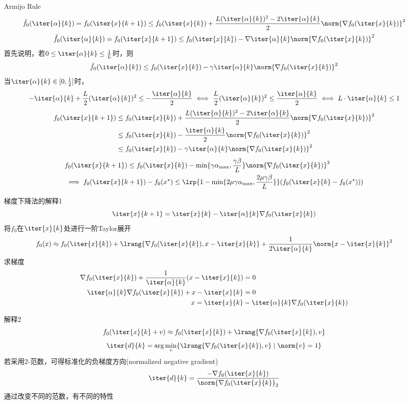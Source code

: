 Armijo Rule
\[\tilde{f}_0(\iter{\alpha}{k})=f_0(\iter{x}{k+1})\leq f_0(\iter{x}{k})+\frac{L(\iter{\alpha}{k})^2-2\iter{\alpha}{k}}{2}\norm{\nabla f_0(\iter{x}{k})}^2\]
\[\tilde{f}_0(\iter{\alpha}{k})=f_0(\iter{x}{k+1})\leq f_0(\iter{x}{k})-\nabla\iter{\alpha}{k}\norm{\nabla f_0(\iter{x}{k})}^2\]
首先说明，若$0\leq\iter{\alpha}{k}\leq\frac{1}{L}$时，则
\[\tilde{f}_0(\iter{\alpha}{k})\leq f_0(\iter{x}{k})-\gamma\iter{\alpha}{k}\norm{\nabla f_0(\iter{x}{k})}^2\]
当$\iter{\alpha}{k}\in[0,\frac{1}{2}]$时，
\[-\iter{\alpha}{k}+\frac{L}{2}(\iter{\alpha}{k})^2\leq -\frac{\iter{\alpha}{k}}{2}\iff \frac{L}{2}(\iter{\alpha}{k})^2\leq\frac{\iter{\alpha}{k}}{2}\iff L\cdot\iter{\alpha}{k}\leq 1\]
\[\begin{aligned}
    f_0(\iter{x}{k+1})&\leq f_0(\iter{x}{k})+\frac{L(\iter{\alpha}{k})^2-2\iter{\alpha}{k}}{2}\norm{\nabla f_0(\iter{x}{k})}^2\\
    &\leq f_0(\iter{x}{k})-\frac{\iter{\alpha}{k}}{2}\norm{\nabla f_0(\iter{x}{k})}^2\\
    &\leq f_0(\iter{x}{k})-\gamma\iter{\alpha}{k}\norm{\nabla f_0(\iter{x}{k})}^2
\end{aligned}\]
\[\begin{aligned}
    &f_0(\iter{x}{k+1})\leq f_0(\iter{x}{k})-\min\{\gamma\alpha_{\max},\frac{\gamma\beta}{L}\}\norm{\nabla f_0(\iter{x}{k})}^2\\
    &\implies f_0(\iter{x}{k+1})-f_0(x^\star)\leq\lrp{1-\min\{2\mu\gamma\alpha_{\max},\frac{2\mu\gamma\beta}{L}\}}(f_0(\iter{x}{k}-f_0(x^\star)))
\end{aligned}\]

梯度下降法的解释1
\[\iter{x}{k+1}=\iter{x}{k}-\iter{\alpha}{k}\nabla f_0(\iter{x}{k})\]
将$f_0$在$\iter{x}{k}$处进行一阶Taylor展开
\[f_0(x)\approx f_0(\iter{x}{k})+\lrang{\nabla f_0(\iter{x}{k}),x-\iter{x}{k}}+\frac{1}{2\iter{\alpha}{k}}\norm{x-\iter{x}{k}}^2\]
求梯度
\[\begin{aligned}
    \nabla f_0(\iter{x}{k})+\frac{1}{\iter{\alpha}{k}}(x-\iter{x}{k})&=0\\
    \iter{\alpha}{k}\nabla f_0(\iter{x}{k})+x-\iter{x}{k}&=0\\
    x=\iter{x}{k}&-\iter{\alpha}{k}\nabla f_0(\iter{x}{k})
\end{aligned}\]

解释2
\[f_0(\iter{x}{k}+v)\approx f_0(\iter{x}{k})+\lrang{\nabla f_0(\iter{x}{k}),v}\]
\[\iter{d}{k}=\arg\min_v\{\lrang{\nabla f_0(\iter{x}{k}),v}\mid \norm{v}=1\}\]
若采用2-范数，可得标准化的负梯度方向(normalized negative gradient)
\[\iter{d}{k}=\frac{-\nabla f_0(\iter{x}{k})}{\norm{\nabla f_0(\iter{x}{k}}_2}\]
通过改变不同的范数，有不同的特性

